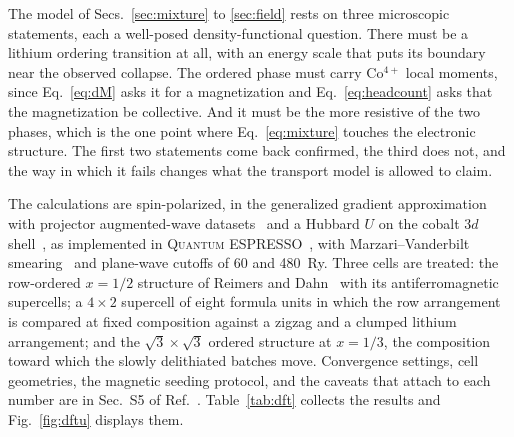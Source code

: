 \documentclass[reprint,twocolumn,prb,amsmath,amssymb,superscriptaddress,floatfix]{revtex4-2}
\begin{document}
The model of Secs.~\ref{sec:mixture} to \ref{sec:field} rests on three microscopic statements,
each a well-posed density-functional question. There must be a lithium ordering transition at
all, with an energy scale that puts its boundary near the observed collapse. The ordered phase
must carry Co$^{4+}$ local moments, since Eq.~\eqref{eq:dM} asks it for a magnetization and
Eq.~\eqref{eq:headcount} asks that the magnetization be collective. And it must be the more
resistive of the two phases, which is the one point where Eq.~\eqref{eq:mixture} touches the
electronic structure. The first two statements come back confirmed, the third does not, and the
way in which it fails changes what the transport model is allowed to claim.

The calculations are spin-polarized, in the generalized gradient
approximation~\cite{PBE1996} with projector augmented-wave datasets~\cite{Blochl1994} and a
Hubbard $U$ on the cobalt $3d$
shell~\cite{Anisimov1991,Dudarev1998,Cococcioni2005,Zhou2004,Wang2006}, as implemented in
\textsc{Quantum ESPRESSO}~\cite{Giannozzi2009,Giannozzi2017}, with Marzari--Vanderbilt
smearing~\cite{Marzari1999} and plane-wave cutoffs of 60 and 480~Ry. Three cells are treated:
the row-ordered $x=1/2$ structure of Reimers and Dahn~\cite{Reimers1992,VanderVen1998} with its
antiferromagnetic supercells; a $4\times2$ supercell of eight formula units in which the row
arrangement is compared at fixed composition against a zigzag and a clumped lithium
arrangement; and the $\sqrt3\times\sqrt3$ ordered structure at $x=1/3$, the composition toward
which the slowly delithiated batches move. Convergence settings, cell geometries, the magnetic
seeding protocol, and the caveats that attach to each number are in Sec.~S5 of
Ref.~\cite{SM}. Table~\ref{tab:dft} collects the results and Fig.~\ref{fig:dftu} displays them.
\end{document}
